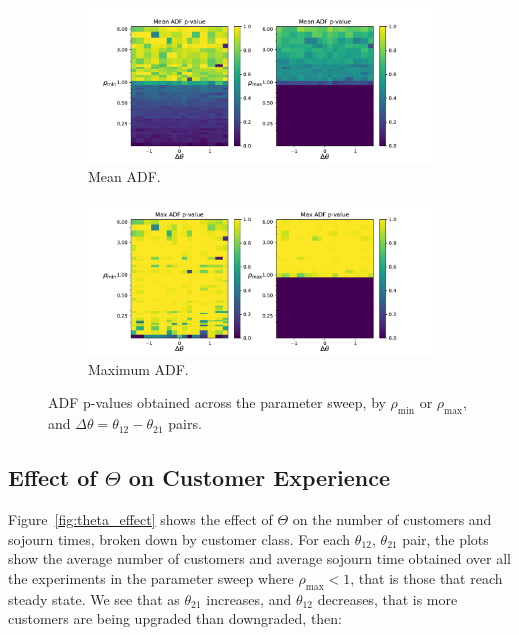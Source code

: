 \documentclass{article}
\begin{document}
\begin{figure}[!htbp]
  \begin{center}
  \begin{subfigure}[b]{\textwidth}
    \includegraphics[width=\textwidth]{img/mean_adf.pdf}
    \caption{Mean ADF.}
  \end{subfigure}
  \begin{subfigure}[b]{\textwidth}
    \includegraphics[width=\textwidth]{img/max_adf.pdf}
    \caption{Maximum ADF.}
  \end{subfigure}
  \end{center}
  \caption{ADF p-values obtained across the parameter sweep, by
  $\rho_{\text{min}}$ or $\rho_{\text{max}}$, and
  $\Delta\theta = \theta_{12} - \theta_{21}$ pairs.}
  \label{fig:adf_parametersweep}
\end{figure}


\subsection{Effect of $\Theta$ on Customer Experience}
Figure~\ref{fig:theta_effect} shows the effect of $\Theta$ on the number of customers and sojourn times, broken down by customer class. For each $\theta_{12}$, $\theta_{21}$ pair, the plots show the average number of customers and average sojourn time obtained over all the experiments in the parameter sweep where $\rho_{\max} < 1$, that is those that reach steady state. We see that as $\theta_{21}$ increases, and $\theta_{12}$ decreases, that is more customers are being upgraded than downgraded, then:
\end{document}
